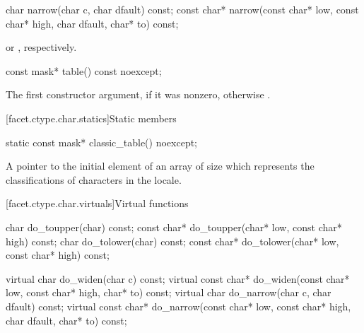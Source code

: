 %
\begin{itemdecl}
char        narrow(char c, char dfault) const;
const char* narrow(const char* low, const char* high, char dfault, char* to) const;
\end{itemdecl}

\begin{itemdescr}
\pnum
\returns
{}%
or
%
,
respectively.
\end{itemdescr}

%
\begin{itemdecl}
const mask* table() const noexcept;
\end{itemdecl}

\begin{itemdescr}
\pnum
\returns
The first constructor argument, if it was nonzero, otherwise
.
\end{itemdescr}

[facet.ctype.char.statics]{Static members}

%
\begin{itemdecl}
static const mask* classic_table() noexcept;
\end{itemdecl}

\begin{itemdescr}
\pnum
\returns
A pointer to the initial element of an array of size
which represents the classifications of characters in the  locale.
\end{itemdescr}

[facet.ctype.char.virtuals]{Virtual functions}

%
%
%
%
\begin{codeblock}
char        do_toupper(char) const;
const char* do_toupper(char* low, const char* high) const;
char        do_tolower(char) const;
const char* do_tolower(char* low, const char* high) const;

virtual char        do_widen(char c) const;
virtual const char* do_widen(const char* low, const char* high, char* to) const;
virtual char        do_narrow(char c, char dfault) const;
virtual const char* do_narrow(const char* low, const char* high,
                              char dfault, char* to) const;
\end{codeblock}

